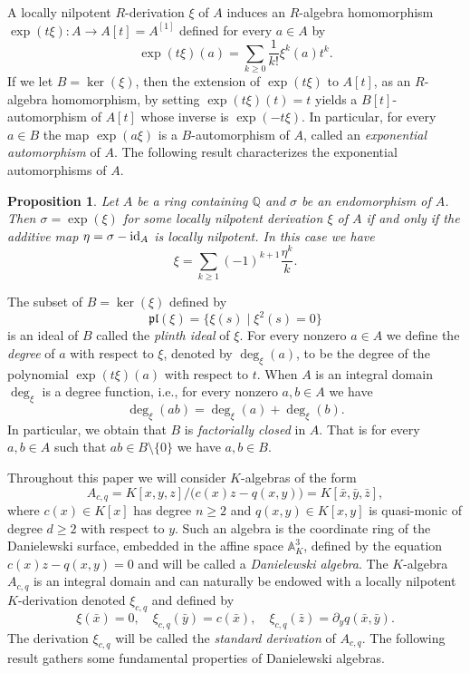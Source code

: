 \documentclass{article}
\newcommand \Q {\mathbb{Q}}
\newcommand \pl {\mathfrak{pl}}
\renewcommand \a {A}
\newcommand \ring {R}
\renewcommand \k {K}
\newcommand \affine {\mathbb{A}}
\newtheorem{proposition}[theorem]{Proposition}
\begin{document}
{A locally nilpotent $\ring$-derivation $\xi$ of $A$ induces an $\ring$-algebra homomorphism $\exp(t\xi):A\longrightarrow A[t]=A^{[1]}$ defined for every $a\in A$ by $$\exp(t\xi)(a)=\sum_{k\geq 0}\frac{1}{k!}\xi^k(a)t^k.$$ If we let $B=\ker(\xi)$, then the extension of $\exp(t\xi)$ to $A[t]$, as an $\ring$-algebra homomorphism, by setting $\exp(t\xi)(t)=t$ yields a $B[t]$-automorphism of $A[t]$ whose inverse is $\exp(-t\xi)$. In particular, for every $a\in B$ the map $\exp(a\xi)$ is a $B$-automorphism of $\a$, called an {\it exponential automorphism} of $\a$. The following result \cite[Proposition 2.1.3]{essen_book} characterizes the exponential automorphisms of $\a$.

\begin{proposition}\label{exponentialAutomorphisms}Let $\a$ be a ring containing $\Q$ and $\sigma$ be an endomorphism of $\a$. Then $\sigma=\exp(\xi)$ for some locally nilpotent derivation $\xi$ of $\a$ if and only if the additive map $\eta=\sigma-{\rm id}_{\a}$ is locally nilpotent. In this case we have
	$$\xi=\sum_{k\geq 1}(-1)^{k+1}\frac{\eta^k}{k}.$$
\end{proposition}

The subset of $B=\ker(\xi)$ defined by $$\pl(\xi)=\big\{\xi(s)\mid \xi^2(s)=0\big\}$$ is an ideal of $B$ called the {\it plinth ideal} of $\xi$. For every nonzero $a\in A$ we define the {\it degree} of $a$ with respect to $\xi$, denoted by $\deg_{\xi}(a)$, to be the degree of the polynomial $\exp(t\xi)(a)$ with respect to $t$. When $A$ is an integral domain $\deg_{\xi}$ is a degree function, i.e., for every nonzero $a,b\in A$ we have $$\deg_{\xi}(ab)=\deg_{\xi}(a)+\deg_{\xi}(b).$$ In particular, we obtain that $B$ is {\it factorially closed} in $A$. That is for every $a,b\in A$ such that $ab\in B\setminus\{0\}$ we have $a,b\in B$.

\medskip Throughout this paper we will consider $\k$-algebras of the form $$\a_{c,q}=\k[x,y,z]/\big(c(x)z-q(x,y)\big)=\k[\bar{x},\bar{y},\bar{z}],$$ where $c(x)\in\k[x]$ has degree $n\geq 2$ and $q(x,y)\in\k[x,y]$ is quasi-monic of degree $d\geq 2$ with respect to $y$. Such an algebra is the coordinate ring of the Danielewski surface, embedded in the affine space $\affine_{\k}^{3}$, defined by the equation $c(x)z-q(x,y)=0$ and will be called a {\it Danielewski algebra}. The $\k$-algebra $\a_{c,q}$ is an integral domain and can naturally be endowed with a locally nilpotent $\k$-derivation denoted $\xi_{c,q}$ and defined by $$\xi(\bar{x})=0,\quad \xi_{c,q}(\bar{y})=c(\bar{x}),\quad \xi_{c,q}(\bar{z})=\partial_yq(\bar{x},\bar{y}).$$ The derivation $\xi_{c,q}$ will be called the {\it standard derivation} of $\a_{c,q}$. The following result \cite[Theorem 5]{bianchi_vesolo_2017} gathers some fundamental properties of Danielewski algebras.

}
\end{document}
